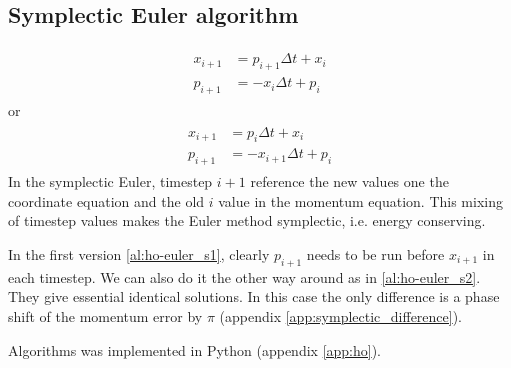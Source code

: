\subsection{Symplectic Euler algorithm}
\begin{align}
\begin{split}
\label{al:ho-euler_s1}
x_{i+1} &= p_{i+1}\Delta t + x_i  \\
p_{i+1} &= -x_i\Delta t + p_i
\end{split}
\end{align}
or
\begin{align}
\begin{split}
\label{al:ho-euler_s2}
x_{i+1} &= p_{i}\Delta t + x_i  \\
p_{i+1} &= -x_{i+1}\Delta t + p_i
\end{split}
\end{align}
In the symplectic Euler, timestep $i+1$ reference the new values one the coordinate equation and the old $i$ value in the momentum equation. This mixing of timestep values makes the Euler method symplectic, i.e. energy conserving.

In the first version \eqref{al:ho-euler_s1}, clearly $p_{i+1}$ needs to be run before $x_{i+1}$ in each timestep. We can also do it the other way around as in \eqref{al:ho-euler_s2}. They give essential identical solutions. In this case the only difference is a phase shift of the momentum error by $\pi$ (appendix \ref{app:symplectic_difference}).

Algorithms  was implemented in Python (appendix \ref{app:ho}).

